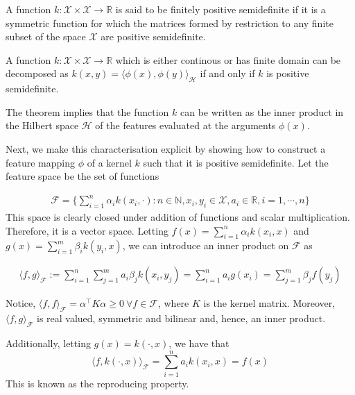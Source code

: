 \begin{definition}
    A function $k: \mathcal{X} \times \mathcal{X} \to \mathbb{R}$ is said to be finitely positive semidefinite if it is a symmetric function for which the matrices formed by restriction to any finite subset of the space $\mathcal{X}$ are positive semidefinite.
\end{definition}

\begin{theorem}    
    A function $k:\mathcal{X} \times \mathcal{X} \to \mathbb{R}$ which is either continous or has finite domain can be decomposed as $k(x,y)=\langle \phi(x), \phi(y) \rangle_{\mathcal{H}}$ if and only if $k$ is positive semidefinite.
\end{theorem}

The theorem implies that the function $k$ can be written as the inner product in the Hilbert space $\mathcal{H}$ of the features evaluated at the arguments $\phi(x)$.

Next, we make this characterisation explicit by showing how to construct a feature mapping $\phi$ of a kernel $k$ such that it is positive semidefinite.
Let the feature space be the set of functions 

$$ 
\begin{aligned}
    \mathcal{F} =\bigg\{ \sum\limits_{i=1}^n \alpha_i k(x_i, \cdot): n \in \mathbb{N}, x_i, y_i \in \mathcal{X}, a_i \in \mathbb{R}, i=1,\cdots, n \bigg\}    
\end{aligned}
$$
This space is clearly closed under addition of functions and scalar multiplication. Therefore, it is a vector space.
Letting $f(x)=\sum\limits_{i=1}^n \alpha_i k(x_i,x)$ and $g(x)=\sum\limits_{i=1}^m \beta_i k(y_i,x)$,  we can introduce an inner product on $\mathcal{F}$ as 

$$
\begin{aligned}
    \langle f,g \rangle_{\mathcal{F}}:=\sum\limits_{i=1}^n\sum\limits_{j=1}^m a_i \beta_j k(x_i,y_j)=\sum\limits_{i=1}^n a_i g(x_i)= \sum\limits_{j=1}^m \beta_j f(y_j)
\end{aligned}
$$

Notice, $\langle f, f \rangle_{\mathcal{F}}= \alpha^\intercal K \alpha \geq 0 \ \forall f \in \mathcal{F}$, where $K$ is the kernel matrix.
Moreover, $\langle f, g \rangle_{\mathcal{F}}$ is real valued, symmetric and bilinear and, hence, an inner product.

Additionally, letting $g(x)=k(\cdot, x)$, we have that 
\begin{equation}
    \langle f, k(\cdot, x)\rangle_{\mathcal{F}}=\sum\limits_{i=1}^n a_i k(x_i,x)=f(x)    
\end{equation}
This is known as the reproducing property.

